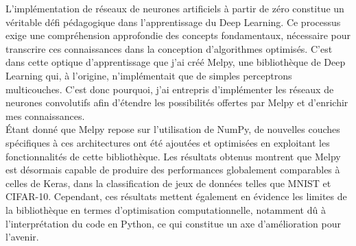 L’implémentation de réseaux de neurones artificiels à partir de zéro constitue un véritable défi 
pédagogique dans l’apprentissage du Deep Learning. Ce processus exige une compréhension approfondie 
des concepts fondamentaux, nécessaire pour transcrire ces connaissances dans la conception d’algorithmes 
optimisés. C’est dans cette optique d'apprentissage que j’ai créé Melpy, une bibliothèque 
de Deep Learning qui, à l’origine, n’implémentait que de simples perceptrons multicouches\cite{MLP}. C'est donc pourquoi, 
j’ai entrepris d’implémenter les réseaux de neurones convolutifs afin d’étendre les possibilités offertes par 
Melpy et d’enrichir mes connaissances. \\


Étant donné que Melpy repose sur l’utilisation de NumPy, de nouvelles couches spécifiques à ces architectures 
ont été ajoutées et optimisées en exploitant les fonctionnalités de cette bibliothèque. Les résultats obtenus 
montrent que Melpy est désormais capable de produire des performances globalement comparables à celles de Keras, 
dans la classification de jeux de données telles que MNIST\cite{MNIST} et CIFAR-10\cite{CIFAR10}. Cependant, ces résultats mettent également 
en évidence les limites de la bibliothèque en termes d’optimisation computationnelle, notamment dû à l'interprétation
du code en Python, ce qui constitue un axe d'amélioration pour l'avenir.